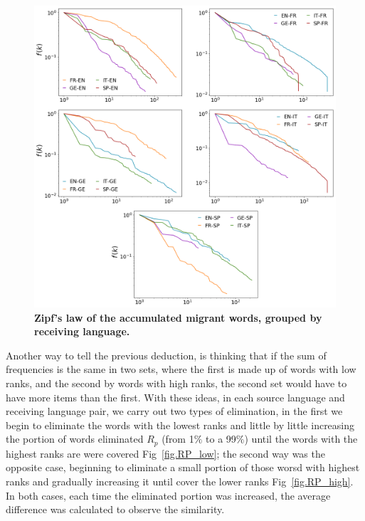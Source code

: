 \documentclass[10pt,letterpaper]{article} %
\begin{document}
\begin{figure}[!h]
	\begin{adjustwidth}{-2.5cm}{1cm}
		\centering
		\includegraphics[scale=.38]{ZL_receptor.png}
		\caption{{\bf Zipf's law of the accumulated migrant words, grouped by receiving language.} }
		\label{fig.ZL_receiving}
	\end{adjustwidth}
\end{figure}


Another way to tell the previous deduction, is thinking that if the sum of frequencies is the same in two sets, where the first is made up of words with low ranks, and the second by words with high ranks, the second set would have to have more items than the first. With these ideas, in each source language and receiving language pair, we carry out two types of elimination, in the first we begin to eliminate the words with the lowest ranks and little by little increasing the portion of words eliminated $R_{p}$ (from 1$\%$ to a 99$\%$) until the words with the highest ranks are
were covered Fig~\ref{fig.RP_low}; the second way was the opposite case, beginning to eliminate a small portion of those worsd with highest ranks and gradually increasing it until cover the lower ranks Fig~\ref{fig.RP_high}. In both cases, each time the eliminated portion was increased, the average difference was calculated to observe the similarity.
\end{document}
